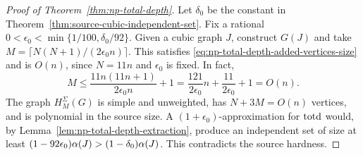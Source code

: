 \begin{proof}[Proof of Theorem~\ref{thm:np-total-depth}]
Let $\delta_0$ be the constant in
Theorem~\ref{thm:source-cubic-independent-set}. Fix a rational
$0<\epsilon_0<\min\{1/100,\delta_0/92\}$.
Given a cubic graph $J$, construct $G(J)$ and take
$M=\lceil N(N+1)/(2\epsilon_0 n)\rceil$. This satisfies
\eqref{eq:np-total-depth-added-vertices-size} and is $O(n)$, since
$N=11n$ and $\epsilon_0$ is fixed. In fact,
\[
 M\le\frac{11n(11n+1)}{2\epsilon_0n}+1
   =\frac{121}{2\epsilon_0}n+\frac{11}{2\epsilon_0}+1=O(n).
\]
The graph $H^{\Sigma}_M(G)$ is simple
and unweighted, has $N+3M=O(n)$ vertices, and is polynomial in the
source size. A $(1+\epsilon_0)$-approximation for $\operatorname{totd}$ would, by
Lemma~\ref{lem:np-total-depth-extraction}, produce an independent
set of size at least
$(1-92\epsilon_0)\alpha(J)>(1-\delta_0)\alpha(J)$.
This contradicts the source hardness.
\end{proof}
